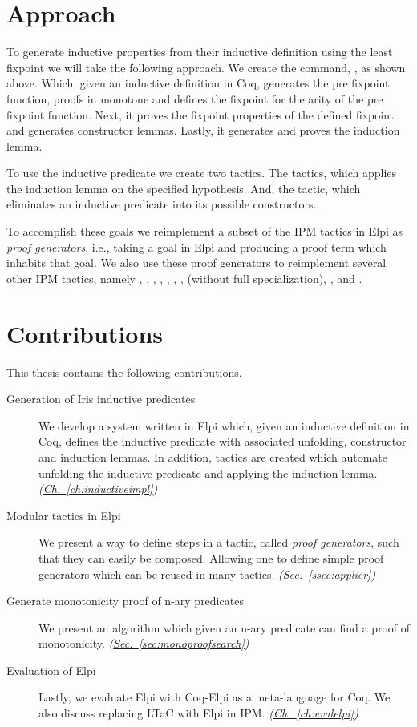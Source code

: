 \documentclass[thesis.tex]{subfiles}
\begin{document}
\section{Approach}
To generate inductive properties from their inductive definition using the least fixpoint we will take the following approach. We create the command, , as shown above. Which, given an inductive definition in Coq, generates the pre fixpoint function, proofs in monotone and defines the fixpoint for the arity of the pre fixpoint function. Next, it proves the fixpoint properties of the defined fixpoint and generates constructor lemmas. Lastly, it generates and proves the induction lemma.

To use the inductive predicate we create two tactics. The  tactics, which applies the induction lemma on the specified hypothesis. And, the  tactic, which eliminates an inductive predicate into its possible constructors.

To accomplish these goals we reimplement a subset of the IPM tactics in Elpi as \emph{proof generators}, i.e., taking a goal in Elpi and producing a proof term which inhabits that goal. We also use these proof generators to reimplement several other IPM tactics, namely , , , , , , ,  (without full specialization), , and .

\section{Contributions}
This thesis contains the following contributions.
\begin{description}
  \item[Generation of Iris inductive predicates] We develop a system written in Elpi which, given an inductive definition in Coq, defines the inductive predicate with associated unfolding, constructor and induction lemmas. In addition, tactics are created which automate unfolding the inductive predicate and applying the induction lemma. \emph{(\hyperref[ch:inductiveimpl]{Ch.~\ref*{ch:inductiveimpl}})}
  \item[Modular tactics in Elpi] We present a way to define steps in a tactic, called \emph{proof generators}, such that they can easily be composed. Allowing one to define simple proof generators which can be reused in many tactics. \emph{(\hyperref[ssec:applier]{Sec.~\ref*{ssec:applier}})}
  \item[Generate monotonicity proof of n-ary predicates] We present an algorithm which given an n-ary predicate can find a proof of monotonicity. \emph{(\hyperref[sec:monoproofsearch]{Sec.~\ref*{sec:monoproofsearch}})}
  \item[Evaluation of Elpi] Lastly, we evaluate Elpi with Coq-Elpi as a meta-language for Coq. We also discuss replacing LTaC with Elpi in IPM. \emph{(\hyperref[ch:evalelpi]{Ch.~\ref*{ch:evalelpi}})}
\end{description}
\end{document}
